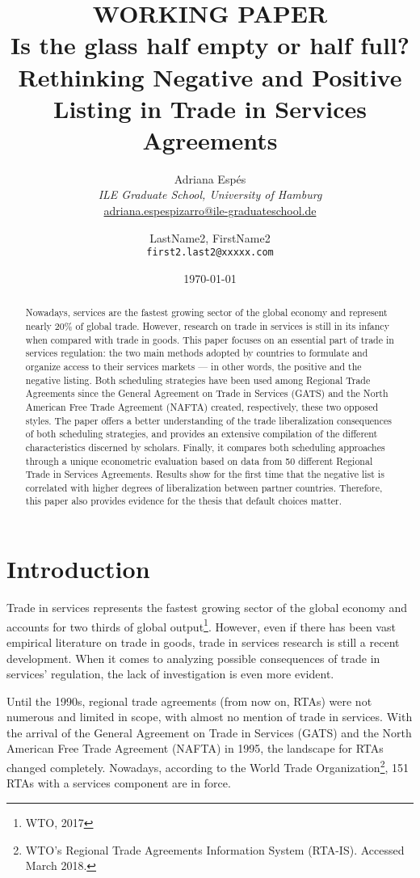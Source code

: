 \documentclass{article}
\title{WORKING PAPER\\Is the glass half empty or half full?\\Rethinking Negative and Positive Listing in Trade in Services Agreements}
\author{
  Adriana Espés\\
  \textit{ILE Graduate School, University of Hamburg}\\
  \url{adriana.espespizarro@ile-graduateschool.de}
  \and
  LastName2, FirstName2\\
  \texttt{first2.last2@xxxxx.com}
}
\date{\today}
\begin{document}
\onehalfspacing

\maketitle

\begin{abstract}
    Nowadays, services are the fastest growing sector of the global economy and represent nearly 20\% of global trade. However, research on trade in services is still in its infancy when compared with trade in goods. This paper focuses on an essential part of trade in services regulation: the two main methods adopted by countries to formulate and organize access to their services markets — in other words, the positive and the negative listing. Both scheduling strategies have been used among Regional Trade Agreements since the General Agreement on Trade in Services (GATS) and the North American Free Trade Agreement (NAFTA) created, respectively, these two opposed styles. The paper offers a better understanding of the trade liberalization consequences of both scheduling strategies, and provides an extensive compilation of the different characteristics discerned by scholars. Finally, it compares both scheduling approaches through a unique econometric evaluation based on data from 50 different Regional Trade in Services Agreements. Results show for the first time that the negative list is correlated with higher degrees of liberalization between partner countries. Therefore, this paper also provides evidence for the thesis that default choices matter.
\end{abstract}

\doublespacing

\section{Introduction}
Trade in services represents the fastest growing sector of the global economy and accounts for two thirds of global output\footnote{WTO, 2017}. However, even if there has been vast empirical literature on trade in goods, trade in services research is still a recent development. When it comes to analyzing possible consequences of trade in services’ regulation, the lack of investigation is even more evident.

\smallskip

Until the 1990s, regional trade agreements (from now on, RTAs) were not numerous and limited in scope, with almost no mention of trade in services. With the arrival of the General Agreement on Trade in Services (GATS) and the North American Free Trade Agreement (NAFTA) in 1995, the landscape for RTAs changed completely. Nowadays, according to the World Trade Organization\footnote{WTO’s Regional Trade Agreements Information System (RTA-IS). Accessed March 2018.}, 151 RTAs with a services component are in force.
\end{document}
